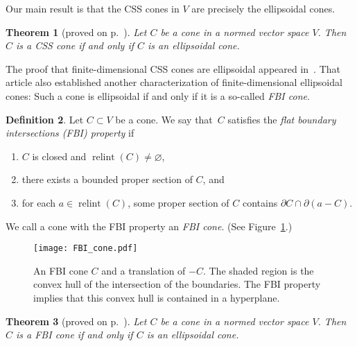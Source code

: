 \documentclass[10pt]{amsart}
\newtheorem{thm}{Theorem}[section]
\theoremstyle{definition}
\newtheorem{definition}[thm]{Definition}
\theoremstyle{remark}
\begin{document}
Our main result is that the CSS cones in $V$ are precisely the
ellipsoidal cones.
\begin{thm}[proved on p.\ \pageref{proof:CSSproof}]
   \label{thm:CSSTheorem}
   Let $C$ be a cone in a normed vector space $V$.  Then $C$ is a
   CSS cone if and only if $C$ is an ellipsoidal cone.
\end{thm}

The proof that finite-dimensional CSS cones are ellipsoidal
appeared in~\cite{JerMcA2013}.  That article also established
another characterization of fi\-nite-di\-men\-sion\-al ellipsoidal
cones: Such a cone is ellipsoidal if and only if it is a so-called
\emph{FBI cone}.

\begin{definition}
   \label{def:FBI}
   Let $C \subset V$ be a cone.  We say that~$C$ satisfies the
   \emph{flat boundary intersections \textup{(}FBI\textup{)}
   property} if
   \begin{enumerate}
      \item 
      $C$ is closed and ${\operatorname{relint}({C})} \ne {\varnothing}$,
      
      \item  
      there exists a bounded proper section of $C$, and
   
      \item  
      for each $a \in {\operatorname{relint}({C})}$, some proper section of $C$
      contains ${\partial} C \cap {\partial}(a - C)$.
   \end{enumerate}
   We call a cone with the FBI property an \emph{FBI cone}.  (See 
   Figure~\ref{fig:FBICone}.)
\end{definition}

\begin{figure}
   \begin{center}
      \texttt{[image: FBI\_cone.pdf]}      
   \end{center}
   \caption{An FBI cone $C$ and a translation of $-C$.  The shaded
   region is the convex hull of the intersection of the
   boundaries.  The FBI property implies that this convex hull is
   contained in a hyperplane.}
   \label{fig:FBICone}
\end{figure}

\begin{thm}[proved on p.~\pageref{proof:FBIimpliesEllipsoidal}]
   \label{thm:FBIimpliesEllipsoidal}
   Let $C$ be a cone in a normed vector space $V$.  Then $C$ is a
   FBI cone if and only if $C$ is an ellipsoidal cone.
\end{thm}
\end{document}
